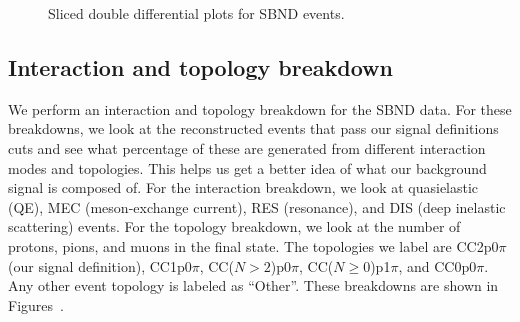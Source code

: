 \documentclass{article}
\begin{document}
\begin{figure}
    \caption{Sliced double differential plots for SBND events.}
    \label{fig:sbnd-double-diff-sliced}
\end{figure}

\clearpage

\subsection{Interaction and topology breakdown}

We perform an interaction and topology breakdown for the SBND data. For these breakdowns, 
we look at the reconstructed events that pass our signal definitions cuts and see what 
percentage of these are generated from different interaction modes and topologies. 
This helps us get a better idea of what our background signal is composed of. For the
interaction breakdown, we look at quasielastic (QE), MEC (meson-exchange current),
RES (resonance), and DIS (deep inelastic scattering) events. For the topology breakdown,
we look at the number of protons, pions, and muons in the final state. The topologies 
we label are CC2p0$\pi$ (our signal definition), CC1p0$\pi$, CC($N>2$)p0$\pi$, CC($N\geq0$)p1$\pi$, and CC0p0$\pi$.
Any other event topology is labeled as ``Other''.
These breakdowns are shown in Figures~.
\end{document}
